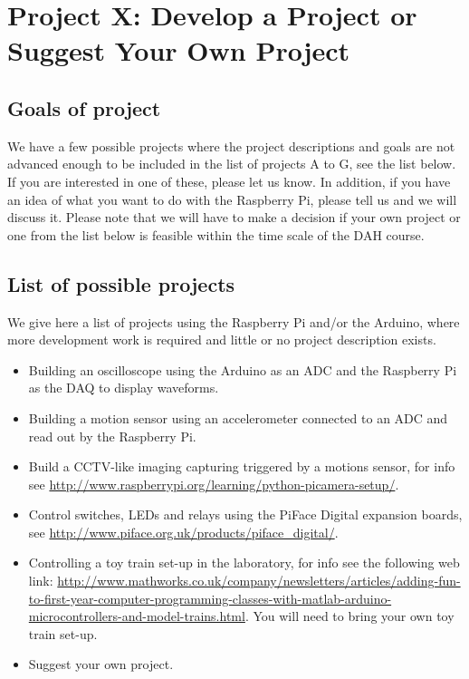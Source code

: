 

\newpage
\section{Project X: Develop a Project or Suggest Your Own Project}

\subsection{Goals of project}

We have a few possible projects where the project descriptions and goals are not advanced enough to be included in the list of projects A to G, see the list below.
If you are interested in one of these, please let us know.
In addition, if you have an idea of what you want to do with the Raspberry Pi, please tell us and we will discuss it.
Please note that we will have to make a decision if your own project or one from the list below is feasible within the time scale of the DAH course.


\subsection{List of possible projects}

We give here a list of projects using the Raspberry Pi and/or the Arduino, where more development work is required and little or no project description exists. 

\begin{itemize}
\item Building an oscilloscope using the Arduino \microcontroller as an ADC and the Raspberry Pi as the DAQ to display waveforms.
\item Building a motion sensor using an accelerometer connected to an ADC and read out by the Raspberry Pi.
\item Build a CCTV-like imaging capturing triggered by a motions sensor, for info see \url{http://www.raspberrypi.org/learning/python-picamera-setup/}.
\item Control switches, LEDs and relays using the PiFace Digital expansion boards, see \url{http://www.piface.org.uk/products/piface_digital/}.
\item Controlling a toy train set-up in the laboratory, for info see the following web link: \url{http://www.mathworks.co.uk/company/newsletters/articles/adding-fun-to-first-year-computer-programming-classes-with-matlab-arduino-microcontrollers-and-model-trains.html}.
You will need to bring your own toy train set-up.
\item Suggest your own project.
\end{itemize}




